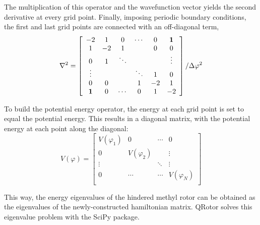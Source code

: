 \documentclass[12pt,a4paper]{article}
\begin{document}
The multiplication of this operator and the wavefunction vector yields the second derivative at every grid point.
Finally, imposing periodic boundary conditions, the first and last grid points are connected with an off-diagonal term,
\[
    \nabla^2 =
    \left[ {\begin{array}{cccccc}
    -2      &  1     &  0     & \cdots &  0    &  \bf{1} \\
     1      & -2     &  1     &        &  0    &  0      \\
     0      &  1     & \ddots &        &       &  \vdots \\
     \vdots &        &        & \ddots &  1    &  0      \\
     0      &  0     &        &  1     & -2    &  1      \\
     \bf{1} &  0     & \cdots &  0     &  1    & -2      \\
    \end{array} } \right] / \Delta\varphi^2
\]

To build the potential energy operator, the energy at each grid point is set to equal the potential energy.
This results in a diagonal matrix, with the potential energy at each point along the diagonal:
\[
    V(\varphi) =
    \left[ {\begin{array}{cccc}
    V(\varphi_1) &  0            &  \cdots &  0          \\
     0           &  V(\varphi_2) &         &  \vdots     \\
     \vdots      &               &  \ddots &   \vdots     \\
     0           &   \cdots      &  \cdots & V(\varphi_N) \\
    \end{array} } \right]
\]

This way, the energy eigenvalues of the hindered methyl rotor can be obtained as the eigenvalues of the newly-constructed hamiltonian matrix. QRotor solves this eigenvalue problem with the SciPy package.

\end{document}
